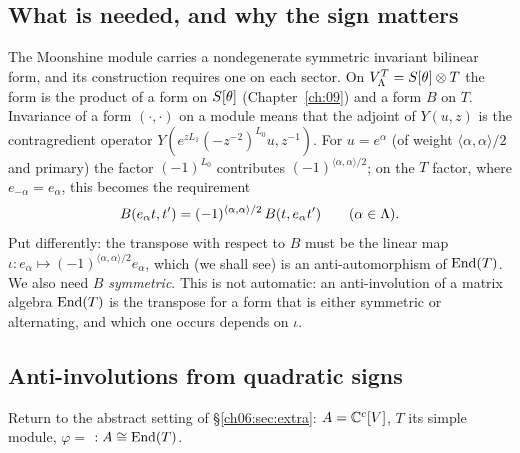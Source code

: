 \subsection{What is needed, and why the sign matters}

The Moonshine module carries a nondegenerate symmetric invariant bilinear form, and its
construction requires one on each sector.  On $V_{\Lambda}^T=S[\theta]\otimes T$ the form is the
product of a form on $S[\theta]$ (Chapter~\ref{ch:09}) and a form $B$ on $T$.  Invariance of a form
$(\cdot,\cdot)$ on a module means that the adjoint of $Y(u,z)$ is the contragredient operator
$Y(e^{zL_1}(-z^{-2})^{L_0}u,z^{-1})$.  For $u=e^\alpha$ (of weight $\langle\alpha,\alpha\rangle/2$
and primary) the factor $(-1)^{L_0}$ contributes $(-1)^{\langle\alpha,\alpha\rangle/2}$; on the $T$
factor, where $e_{-\alpha}=e_\alpha$, this becomes the requirement
\begin{equation}\label{ch06:eq:Tlaw}
  B(e_\alpha t,t')=(-1)^{\langle\alpha,\alpha\rangle/2}\,B(t,e_\alpha t')\qquad(\alpha\in{\Lambda}).
\end{equation}
Put differently: the transpose with respect to $B$ must be the linear map
$\iota:e_\alpha\mapsto(-1)^{\langle\alpha,\alpha\rangle/2}e_\alpha$, which (we shall see) is an
anti-automorphism of $\operatorname{End}(T)$.  We also need $B$ \emph{symmetric}.  This is not automatic: an
anti-involution of a matrix algebra $\operatorname{End}(T)$ is the transpose for a form that is either symmetric
or alternating, and which one occurs depends on $\iota$.

\subsection{Anti-involutions from quadratic signs}

Return to the abstract setting of \S\ref{ch06:sec:extra}: $A={\mathbb{C}}^c[V]$, $T$ its simple module,
$\varphi=$  $:A\cong\operatorname{End}(T)$.

